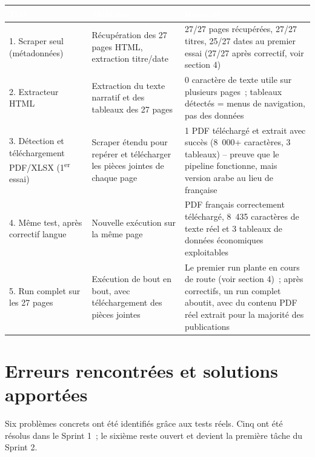 \documentclass[11pt,a4paper]{article}
\newcommand{\tblhead}[1]{\textcolor{white}{\textbf{#1}}}
\begin{document}
\begin{longtable}{@{}p{4.3cm}p{5.4cm}p{5.5cm}@{}}
\rowcolor{navy}
\tblhead{Test} & \tblhead{M\'ethode} & \tblhead{R\'esultat} \\
\midrule
\endhead
1. Scraper seul (m\'etadonn\'ees) & R\'ecup\'eration des 27 pages HTML, extraction titre/date & 27/27 pages r\'ecup\'er\'ees, 27/27 titres, 25/27 dates au premier essai (27/27 apr\`es correctif, voir section 4) \\
2. Extracteur HTML & Extraction du texte narratif et des tableaux des 27 pages & 0 caract\`ere de texte utile sur plusieurs pages~; tableaux d\'etect\'es = menus de navigation, pas des donn\'ees \\
3. D\'etection et t\'el\'echargement PDF/XLSX (1\textsuperscript{er} essai) & Scraper \'etendu pour rep\'erer et t\'el\'echarger les pi\`eces jointes de chaque page & 1 PDF t\'el\'echarg\'e et extrait avec succ\`es (8~000+ caract\`eres, 3 tableaux) -- preuve que le pipeline fonctionne, mais version arabe au lieu de fran\c{c}aise \\
4. M\^eme test, apr\`es correctif langue & Nouvelle ex\'ecution sur la m\^eme page & PDF fran\c{c}ais correctement t\'el\'echarg\'e, 8~435 caract\`eres de texte r\'eel et 3 tableaux de donn\'ees \'economiques exploitables \\
5. Run complet sur les 27 pages & Ex\'ecution de bout en bout, avec t\'el\'echargement des pi\`eces jointes & Le premier run plante en cours de route (voir section 4)~; apr\`es correctifs, un run complet aboutit, avec du contenu PDF r\'eel extrait pour la majorit\'e des publications \\
\end{longtable}

\section{Erreurs rencontr\'ees et solutions apport\'ees}
Six probl\`emes concrets ont \'et\'e identifi\'es gr\^ace aux tests r\'eels. Cinq ont \'et\'e r\'esolus dans le Sprint 1~; le sixi\`eme reste ouvert et devient la premi\`ere t\^ache du Sprint 2.
\end{document}
